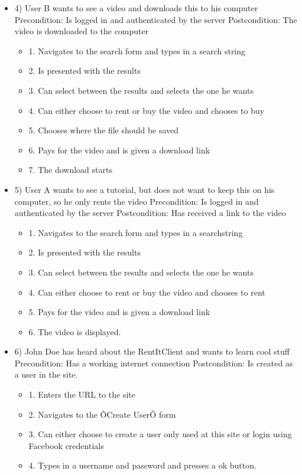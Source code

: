 \begin{itemize}
\item 4) 
User B wants to see a video and downloads this to his computer
\newline Precondition: Is logged in and authenticated by the server 
\newline Postcondition: The video is downloaded to the computer
\begin{itemize}
	\item 1. Navigates to the search form and types in a search string
	\item 2. Is presented with the results
	\item 3. Can select between the results and selects the one he wants
	\item 4. Can either choose to rent or buy the video and chooses to buy
	\item 5. Chooses where the file should be saved
	\item 6. Pays for the video and is given a download link
	\item 7. The download starts
\end{itemize}

\item 5)
User A wants to see a tutorial, but does not want to keep this on his computer, so he only rents the video
\newline Precondition: Is logged in and authenticated by the server
\newline Postcondition: Has received a link to the video
\begin{itemize}
	\item 1. Navigates to the search form and types in a searchstring
	\item 2. Is presented with the results
	\item 3. Can select between the results and selects the one he wants
	\item 4. Can either choose to rent or buy the video and chooses to rent
	\item 5. Pays for the video and is given a download link
	\item 6. The video is displayed. 
\end{itemize}

\item 6)
John Doe has heard about the RentItClient and wants to learn cool stuff
\newline Precondition: Has a working internet connection
\newline Postcondition: Is created as a user in the site. 
\begin{itemize}
	\item 1. Enters the URL to the site
	\item 2. Navigates to the ÔCreate UserÕ form
	\item 3. Can either choose to create a user only used at this site or login using Facebook credentials
	\item 4. Types in a username and password and presses a ok button. 
\end{itemize}


\end{itemize}
